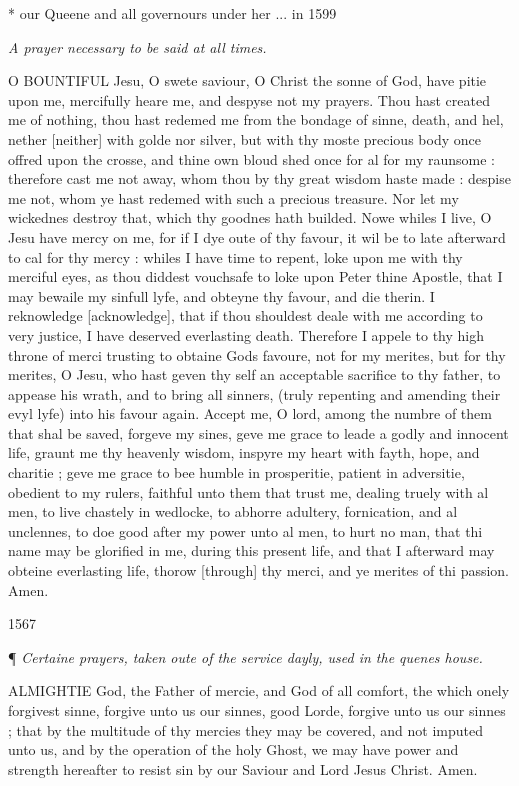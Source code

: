 *
our Queene and all governours under her ...
in 1599

\emph{A
prayer necessary to be said at all times.}

O
BOUNTIFUL Jesu, O swete saviour, O Christ the sonne of God, have pitie
upon me, mercifully heare me, and despyse not my prayers. Thou hast created
me of nothing, thou hast redemed me from the bondage of sinne, death,
and hel, nether [neither]
with golde nor silver, but with thy moste precious body once offred upon
the crosse, and thine own bloud shed once for al for my raunsome : therefore
cast me not away, whom thou by thy great wisdom haste made : despise me
not, whom ye hast redemed with such a precious treasure. Nor let my wickednes
destroy that, which thy goodnes hath builded. Nowe whiles I live, O Jesu
have mercy on me, for if I dye oute of thy favour, it wil be to late afterward
to cal for thy mercy : whiles I have time to repent, loke upon me with
thy merciful eyes, as thou diddest vouchsafe to loke upon Peter thine
Apostle, that I may bewaile my sinfull lyfe, and obteyne thy favour, and
die therin. I reknowledge [acknowledge],
that if thou shouldest deale with me according to very justice, I have
deserved everlasting death. Therefore I appele to thy high throne of merci
trusting to obtaine Gods favoure, not for my merites, but for thy merites,
O Jesu, who hast geven thy self an acceptable sacrifice to thy father,
to appease his wrath, and to bring all sinners, (truly repenting and amending
their evyl lyfe) into his favour again. Accept me, O lord, among the numbre
of them that shal be saved, forgeve my sines, geve me grace to leade a
godly and innocent life, graunt me thy heavenly wisdom, inspyre my heart
with fayth, hope, and charitie ; geve me grace to bee humble in prosperitie,
patient in adversitie, obedient to my rulers, faithful unto them that
trust me, dealing truely with al men, to live chastely in wedlocke, to
abhorre adultery, fornication, and al unclennes, to doe good after my
power unto al men, to hurt no man, that thi name may be glorified in me,
during this present life, and that I afterward may obteine everlasting
life, thorow [through]
thy merci, and ye merites of thi passion. Amen.

1567

¶
\emph{Certaine prayers, taken oute of the service dayly, used in the quenes
house.}

ALMIGHTIE
God, the Father of mercie, and God of all comfort, the which onely forgivest
sinne, forgive unto us our sinnes, good Lorde, forgive unto us our sinnes
; that by the multitude of thy mercies they may be covered, and not imputed
unto us, and by the operation of the holy Ghost, we may have power and
strength hereafter to resist sin by our Saviour and Lord Jesus Christ.
Amen.

